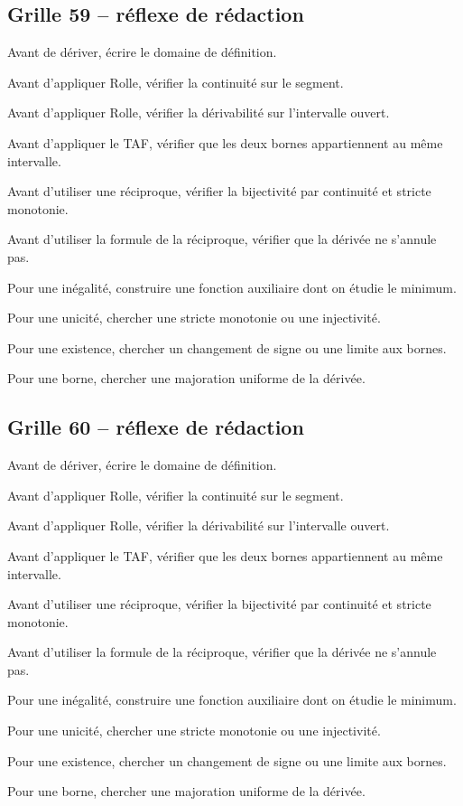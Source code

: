 \documentclass[11pt,a4paper]{article}
\begin{document}
\subsection*{Grille 59 -- réflexe de rédaction}

\begin{methodebox}

Avant de dériver, écrire le domaine de définition.

Avant d'appliquer Rolle, vérifier la continuité sur le segment.

Avant d'appliquer Rolle, vérifier la dérivabilité sur l'intervalle ouvert.

Avant d'appliquer le TAF, vérifier que les deux bornes appartiennent au même intervalle.

Avant d'utiliser une réciproque, vérifier la bijectivité par continuité et stricte monotonie.

Avant d'utiliser la formule de la réciproque, vérifier que la dérivée ne s'annule pas.

Pour une inégalité, construire une fonction auxiliaire dont on étudie le minimum.

Pour une unicité, chercher une stricte monotonie ou une injectivité.

Pour une existence, chercher un changement de signe ou une limite aux bornes.

Pour une borne, chercher une majoration uniforme de la dérivée.

\end{methodebox}

\subsection*{Grille 60 -- réflexe de rédaction}

\begin{methodebox}

Avant de dériver, écrire le domaine de définition.

Avant d'appliquer Rolle, vérifier la continuité sur le segment.

Avant d'appliquer Rolle, vérifier la dérivabilité sur l'intervalle ouvert.

Avant d'appliquer le TAF, vérifier que les deux bornes appartiennent au même intervalle.

Avant d'utiliser une réciproque, vérifier la bijectivité par continuité et stricte monotonie.

Avant d'utiliser la formule de la réciproque, vérifier que la dérivée ne s'annule pas.

Pour une inégalité, construire une fonction auxiliaire dont on étudie le minimum.

Pour une unicité, chercher une stricte monotonie ou une injectivité.

Pour une existence, chercher un changement de signe ou une limite aux bornes.

Pour une borne, chercher une majoration uniforme de la dérivée.

\end{methodebox}
\end{document}
